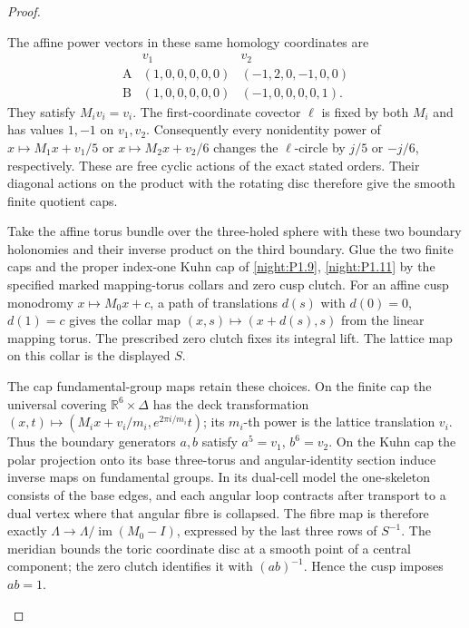 \begin{proof}
\begin{enumerate}[label={$\langle1\rangle$\arabic*.}]
The affine power vectors in these same homology coordinates are
\[
\begin{array}{c|cc}
 &v_1&v_2\\\hline
 \mathrm A&(1,0,0,0,0,0)&(-1,2,0,-1,0,0)\\
 \mathrm B&(1,0,0,0,0,0)&(-1,0,0,0,0,1).
\end{array}
\]
They satisfy $M_iv_i=v_i$. The first-coordinate covector
$\ell$ is fixed by both $M_i$ and has values $1,-1$ on $v_1,v_2$.
Consequently every nonidentity power of
$x\mapsto M_1x+v_1/5$ or $x\mapsto M_2x+v_2/6$ changes the
$\ell$-circle by $j/5$ or $-j/6$, respectively. These are free
cyclic actions of the exact stated orders. Their diagonal actions
on the product with the rotating disc therefore give the smooth finite quotient caps.

Take the affine torus bundle over the three-holed sphere with these
two boundary holonomies and their inverse product on the third
boundary. Glue the two finite caps and the proper index-one Kuhn
cap of \cref{night:P1.9}, \cref{night:P1.11} by the
specified marked mapping-torus collars and zero cusp clutch.
For an affine cusp monodromy $x\mapsto M_0x+c$, a path of translations
$d(s)$ with $d(0)=0$, $d(1)=c$ gives the collar map
$(x,s)\mapsto(x+d(s),s)$ from the linear mapping torus. The prescribed
zero clutch fixes its integral lift. The lattice map on this collar
is the displayed $S$.

The cap fundamental-group maps retain these choices. On the finite
cap the universal covering $\mathbb R^6\times\Delta$ has the deck
transformation
$(x,t)\mapsto(M_ix+v_i/m_i,e^{2\pi i/m_i}t)$; its $m_i$-th power
is the lattice translation $v_i$. Thus the boundary generators
$a,b$ satisfy $a^5=v_1$, $b^6=v_2$. On the Kuhn cap the polar
projection onto its base three-torus and angular-identity section
induce inverse maps on fundamental groups. In its dual-cell model
the one-skeleton consists of the base edges, and each angular loop
contracts after transport to a dual vertex where that angular
fibre is collapsed. The fibre map is therefore exactly
$\Lambda\to\Lambda/\operatorname{im}(M_0-I)$, expressed by the last
three rows of $S^{-1}$. The meridian bounds the toric coordinate
disc at a smooth point of a central component; the zero clutch
identifies it with $(ab)^{-1}$. Hence the cusp imposes $ab=1$.


\end{enumerate}
\end{proof}
